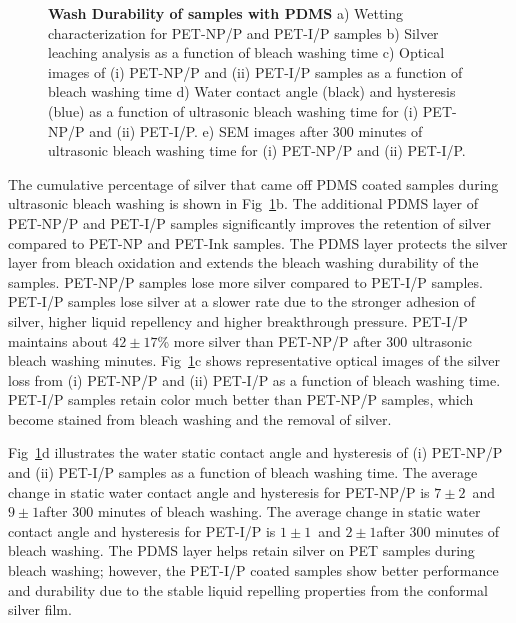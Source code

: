 \documentclass[10pt,letterpaper]{article}
\begin{document}
\begin{figure}[!h]
\caption{{\bf Wash Durability of samples with PDMS}{
a) Wetting characterization for PET-NP/P and PET-I/P samples b) Silver leaching analysis as a function of bleach washing time c) Optical images of (i) PET-NP/P and (ii) PET-I/P samples as a function of bleach washing time d) Water contact angle (black) and hysteresis (blue) as a function of ultrasonic bleach washing time for (i) PET-NP/P and (ii) PET-I/P. e) SEM images after 300 minutes of ultrasonic bleach washing time for (i) PET-NP/P and (ii) PET-I/P.}}
\label{fig4}
\end{figure}

The cumulative percentage of silver that came off PDMS coated samples during ultrasonic bleach washing is shown in Fig~\ref{fig4}b. The additional PDMS layer of PET-NP/P and PET-I/P samples significantly improves the retention of silver compared to PET-NP and PET-Ink samples. The PDMS layer protects the silver layer from bleach oxidation and extends the bleach washing durability of the samples. PET-NP/P samples lose more silver compared to PET-I/P samples. PET-I/P samples lose silver at a slower rate due to the stronger adhesion of silver, higher liquid repellency and higher breakthrough pressure. PET-I/P maintains about $42 \pm 17$\% more silver than PET-NP/P after 300 ultrasonic bleach washing minutes. 
Fig~\ref{fig4}c shows representative optical images of the silver loss from (i) PET-NP/P and (ii) PET-I/P as a function of bleach washing time.  
PET-I/P samples retain color much better than PET-NP/P samples, which become stained from bleach washing and the removal of silver.  

Fig~\ref{fig4}d illustrates the water static contact angle and hysteresis of (i) PET-NP/P and (ii) PET-I/P samples as a function of bleach washing time. The average change in static water contact angle and hysteresis for %
PET-NP/P is $7 \pm 2$\degree~and $9 \pm 1$\degree after 300 minutes of bleach washing. 
The average change in static water contact angle and hysteresis for 
PET-I/P is $1 \pm 1$\degree~and $2 \pm 1$\degree after 300 minutes of bleach washing. 
The PDMS layer helps retain silver on PET samples during bleach washing; however, the PET-I/P coated samples show better performance and durability due to the stable liquid repelling properties from the conformal silver film. 
\end{document}
